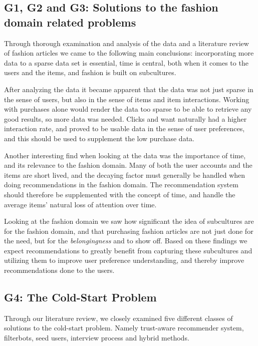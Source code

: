 \subsection{G1, G2 and G3: Solutions to the fashion domain related problems}
\label{sec:fashion-discussion}

Through thorough examination and analysis of the data and a literature review of fashion articles we came to the following main conclusions:
incorporating more data to a sparse data set is essential,
time is central, both when it comes to the users and the items,
and fashion is built on subcultures.

After analyzing the data it became apparent that the data was not just sparse in the sense of users, but also in the sense of items and item interactions.
Working with purchases alone would render the data too sparse to be able to retrieve any good results, so more data was needed.
Clicks and want naturally had a higher interaction rate, and proved to be usable data in the sense of user preferences, and this should be used to supplement the low purchase data.

Another interesting find when looking at the data was the importance of time, and its relevance to the fashion domain.
Many of both the user accounts and the items are short lived, and the decaying factor must generally be handled when doing recommendations in the fashion domain.
The recommendation system should therefore be supplemented with the concept of time, and handle the average items' natural loss of attention over time.

Looking at the fashion domain we saw how significant the idea of subcultures are for the fashion domain, and that purchasing fashion articles are not just done for the need, but for the \emph{belongingness} and to show off.
Based on these findings we expect recommendations to greatly benefit from capturing these subcultures and utilizing them to improve user preference understanding, and thereby improve recommendations done to the users.


\subsection{G4: The Cold-Start Problem}
\label{sec:cold-start-problem-discussion}

Through our literature review, we closely examined five different classes of solutions to the cold-start problem. Namely trust-aware recommender system, filterbots, seed users, interview process and hybrid methods.

